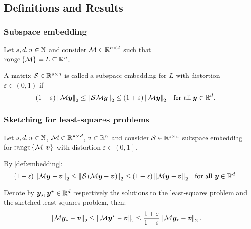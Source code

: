 \subsection{Definitions and Results}

\begin{frame}
    \frametitle{Subspace embedding}

    \begin{definition} \label{def:embedding}
        Let $s, d, n \in \mathbb{N}$ and consider $\mathcal{M} \in \mathbb{R}^{n \times d}$ such that \\ $\operatorname*{range}\left\{\mathcal{M}\right\} = L \subseteq \mathbb{R}^{n}$. 
        
        A matrix $\mathcal{S} \in \mathbb{R}^{s \times n}$ is called a subspace embedding for $L$ with distortion $\varepsilon \in \left(0, 1\right)$ if:
        \begin{align}
            \left( 1 - \varepsilon \right) \left\lVert \mathcal{M} \bm{y} \right\rVert_2 \leq \left\lVert \mathcal{S} \mathcal{M} \bm{y} \right\rVert_2 &\leq \left( 1 + \varepsilon \right) \left\lVert \mathcal{M} \bm{y} \right\rVert_2 &\text{for all } \bm{y} \in \mathbb{R}^{d}. \label{eq:embedding}
        \end{align}
    \end{definition}
\end{frame}

\begin{frame}
    \frametitle{Sketching for least-squares problems}

    \begin{Fact} \label{fact:least_squares}
        Let $s, d, n \in \mathbb{N}$, $\mathcal{M} \in \mathbb{R}^{n \times d}$, $\bm{v} \in \mathbb{R}^{n}$ and consider $\mathcal{S} \in \mathbb{R}^{s \times n}$ subspace embedding for $\operatorname*{range}\left\{\mathcal{M}, \bm{v}\right\}$ with distortion $\varepsilon \in \left(0, 1\right)$. 
        
        By \cref{def:embedding}:
        \begin{align}
            \left( 1 - \varepsilon \right) \left\lVert \mathcal{M} \bm{y} - \bm{v} \right\rVert_2 \leq \left\lVert \mathcal{S} \left( \mathcal{M} \bm{y} - \bm{v} \right) \right\rVert_2 &\leq \left( 1 + \varepsilon \right) \left\lVert \mathcal{M} \bm{y} - \bm{v} \right\rVert_2 &\text{for all } \bm{y} \in \mathbb{R}^{d}. \label{eq:sketched_least_squares_1}
        \end{align}

        Denote by $\bm{y}_{\star}, \bm{y}^{\star} \in \mathbb{R}^{d}$ respectively the solutions to the least-squares problem and the sketched least-squares problem, then:
        \begin{align}
            \left\lVert \mathcal{M} \bm{y}_{\star} - \bm{v} \right\rVert_2 \leq \left\lVert \mathcal{M} \bm{y}^{\star} - \bm{v} \right\rVert_2 \leq \frac{1 + \varepsilon}{1 - \varepsilon} \left\lVert \mathcal{M} \bm{y}_{\star} - \bm{v} \right\rVert_2. \label{eq:sketched_least_squares_2}
        \end{align}
    \end{Fact}
\end{frame}

